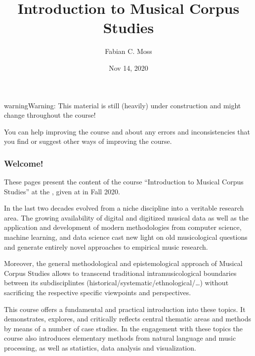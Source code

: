 \documentclass[letterpaper,10pt,english]{sphinxmanual}
\title{Introduction to Musical Corpus Studies}
\date{Nov 14, 2020}
\author{Fabian C.\@{} Moss}
\begin{document}
\pagestyle{empty}
\sphinxmaketitle
\pagestyle{plain}
\sphinxtableofcontents
\pagestyle{normal}
\label{\detokenize{index::doc}}



\begin{sphinxadmonition}{warning}{Warning:}
This material is still (heavily) under construction and might change throughout the course!

You can help improving the course and  about any errors and inconsistencies that you find
or suggest other ways of improving the course.
\end{sphinxadmonition}
\subsubsection*{Welcome!}

These pages present the content of the course “Introduction to Musical Corpus Studies” at the ,
given at  in Fall 2020.

In the last two decades  evolved from a niche discipline into a veritable research area.
The growing availability of digital and digitized musical data as well as the application and development of modern
methodologies from computer science, machine learning, and data science cast new light on old musicological questions
and generate entirely novel approaches to empirical music research.

Moreover, the general methodological and epistemological approach of Musical Corpus Studies allows to transcend traditional
intra\sphinxhyphen{}musicological boundaries between its sub\sphinxhyphen{}disciplintes (historical/systematic/ethnological/…) without sacrificing the
respective specific viewpoints and perspectives.

This course offers a fundamental and practical introduction into these topics.
It demonstrates, explores, and critically reflects central thematic areas and methods by means of a number of case studies.
In the engagement with these topics the course also introduces elementary methods from natural language and music processing,
as well as statistics, data analysis and visualization.
\end{document}
